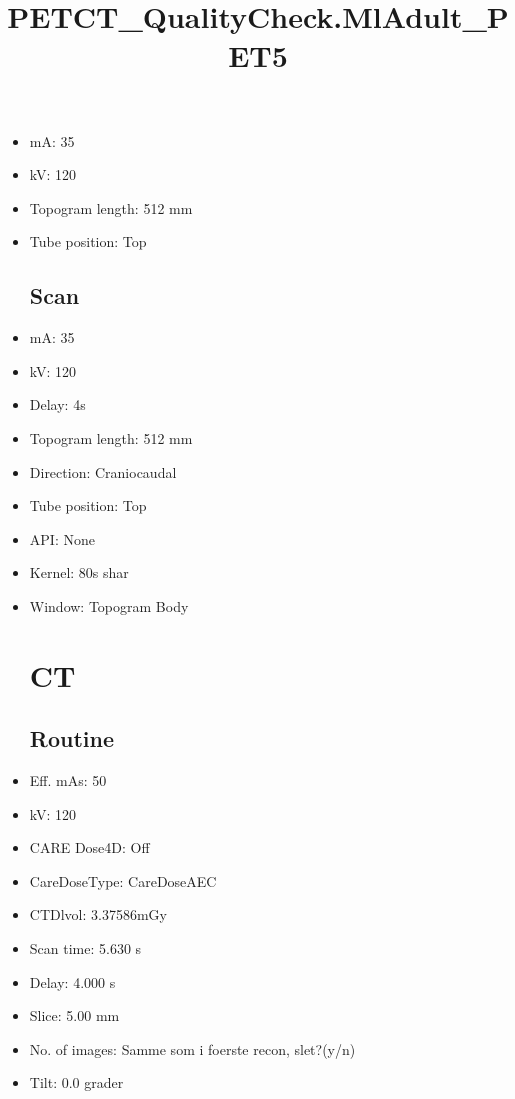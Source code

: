 \documentclass[12pt]{article}
\title{PETCT\_QualityCheck.MlAdult\_PET5}
\begin{document}
\maketitle
\newpage
\tableofcontents
\newpage
{}


\begin{itemize}[noitemsep]\section{Topogram}
\subsection{Routine}
\item mA: 35\item kV: 120\item Topogram length: 512 mm\item Tube position: Top
\subsection{Scan}\item mA: 35\item kV: 120\item Delay: 4s\item Topogram length: 512 mm\item Direction: Craniocaudal\item Tube position: Top\item API: None\item Kernel: 80s shar\item Window: Topogram Body
\section{CT}
\subsection{Routine}
\item Eff. mAs: 50\item kV: 120\item CARE Dose4D: Off\item CareDoseType: CareDoseAEC\item CTDlvol: 3.37586mGy\item Scan time: 5.630 s\item Delay: 4.000 s\item Slice: 5.00 mm\item No. of images: Samme som i foerste recon, slet?(y/n)\item Tilt: 0.0 grader

\end{itemize}
\end{document}
